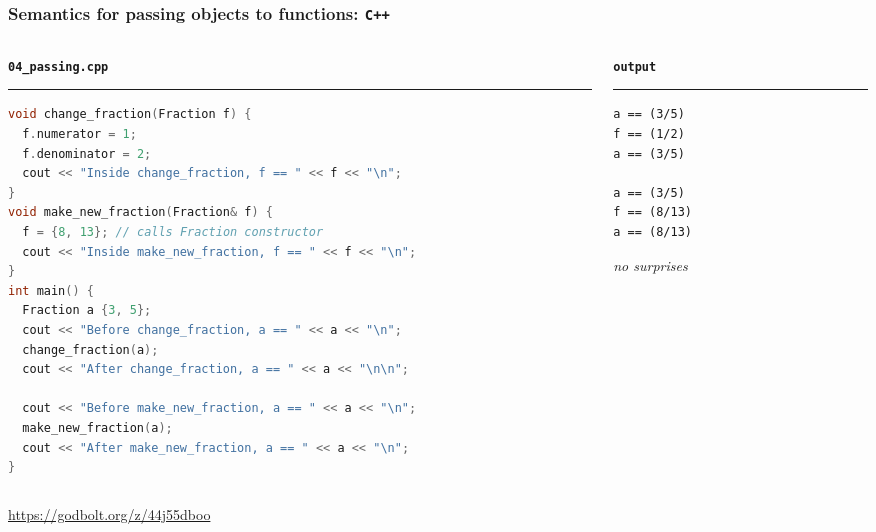 \documentclass[aspectratio=169]{beamer}
\newcommand{\greenemph}[1]{\textit{\textcolor{clGreen}{#1}}}
\newcommand{\cpp}[1]{\texttt{\textbf{\textcolor{clCodeBlue}{#1}}}}
\begin{document}
\begin{frame}[fragile]
\frametitle{Semantics for passing objects to functions: \cpp{C++}}
\begin{columns}[T]
  \begin{column}{0.7\textwidth}
    {\color[HTML]{cb4b16}
    \texttt{\textbf{04\_passing.cpp}}\vspace{-9pt}
    \rule{\linewidth}{2pt}}%
    {\fontsize{7}{7} \begin{lstlisting}[language=C++,showstringspaces=false]
void change_fraction(Fraction f) {
  f.numerator = 1;
  f.denominator = 2;
  cout << "Inside change_fraction, f == " << f << "\n";
}
void make_new_fraction(Fraction& f) {
  f = {8, 13}; // calls Fraction constructor
  cout << "Inside make_new_fraction, f == " << f << "\n";
}
int main() {
  Fraction a {3, 5};
  cout << "Before change_fraction, a == " << a << "\n";
  change_fraction(a);
  cout << "After change_fraction, a == " << a << "\n\n";

  cout << "Before make_new_fraction, a == " << a << "\n";
  make_new_fraction(a);
  cout << "After make_new_fraction, a == " << a << "\n";
}
    \end{lstlisting}}%
    \vspace{-12pt}{\color[HTML]{cb4b16}\rule{\linewidth}{2pt}}%
  \end{column}
  \begin{column}{0.25\textwidth}
    {\color[HTML]{002b36}
    \texttt{\textbf{output}}\vspace{-9pt}
    \rule{\linewidth}{2pt}}%
    {\fontsize{8}{6} \begin{lstlisting}[showstringspaces=false]
a == (3/5)
f == (1/2)
a == (3/5)

a == (3/5)
f == (8/13)
a == (8/13)
    \end{lstlisting}
    }
    \vspace{-12pt}{\color[HTML]{002b36}\rule{\linewidth}{2pt}}
    \greenemph{no surprises}
  \end{column}
\end{columns}

\begin{center}\url{https://godbolt.org/z/44j55dboo}\end{center}
\end{frame}
\end{document}
